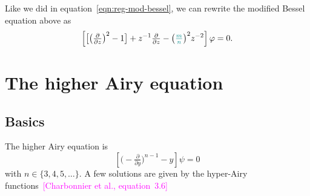 \documentclass{article}
\theoremstyle{plain}
\begin{document}
Like we did in equation~\ref{eqn:reg-mod-bessel}, we can rewrite the modified Bessel equation above as
\begin{equation}%
\left[ \big[ \big(\tfrac{\partial}{\partial z}\big)^2 - 1 \big] + z^{-1} \tfrac{\partial}{\partial z} - \big(\textcolor{DarkCyan}{\tfrac{m}{n}}\big)^2 z^{-2} \right] \varphi = 0.
\end{equation}
\section{The higher Airy equation}
\subsection{Basics}
The higher Airy equation is
\begin{equation}\label{eqn:airy-lucas}
\left[\big({-}\tfrac{\partial}{\partial y}\big)^{n-1} - y\right] \psi = 0
\end{equation}
with $n \in \{3, 4, 5, \ldots\}$. A few solutions are given by the hyper-Airy functions~\textcolor{magenta}{[Charbonnier et al., equation~3.6]}
\end{document}
